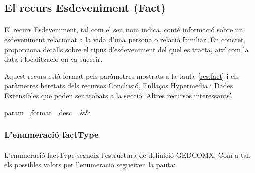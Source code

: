 \subsection{El recurs Esdeveniment (Fact)}

    \paragraph{}
    El recurs Esdeveniment, tal com el seu nom indica, conté informació sobre un esdeveniment relacionat a la vida d'una persona o relació familiar. En concret, proporciona detalls sobre el tipus d'esdeveniment del quel es tracta, així com la data i localització on va succeir.

    Aquest recurs està format pels paràmetres mostrats a la taula~\ref{res:fact} i els paràmetres heretats dels recursos Conclusió, Enllaços Hypermedia i Dades Extensibles que poden ser trobats a la secció `Altres recursos interessants'.

    \begin{center}
             {param=\param,format=\format,desc=\desc}
             {\param&\format&\desc}
     \end{center}


     \subsubsection{L'enumeració factType}

     \paragraph{}
     L'enumeració factType segueix l'estructura de definició GEDCOMX. Com a tal, els possibles valors per l'enumeració segueixen la pauta:

